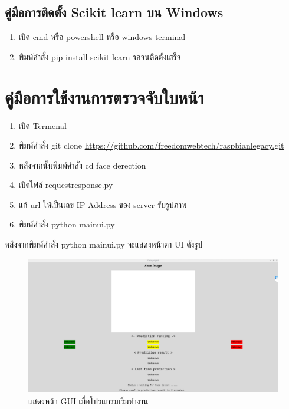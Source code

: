 \subsection{คู่มือการติดตั้ง Scikit learn บน Windows}
\begin{enumerate}
  \item เปิด cmd หรือ powershell หรือ windows terminal
  \item พิมพ์คำสั่ง pip install scikit-learn รอจนติดตั้งเสร็จ
\end{enumerate}


\section{คู่มือการใช้งานการตรวจจับใบหน้า}
\begin{enumerate}
  \item เปิด Termenal
  \item พิมพ์คำสั่ง git clone \url{https://github.com/freedomwebtech/raspbianlegacy.git}
  \item หลังจากนั้นพิมพ์คำสั่ง cd face derection
  \item เปิดไฟล์ request\textunderscore response.py 
  \item แก้ url ให้เป็นเลข IP Address ของ server รับรูปภาพ
  \item พิมพ์คำสั่ง python main\textunderscore ui.py
\end{enumerate}

หลังจากพิมพ์คำสั่ง python main\textunderscore ui.py จะแสดงหน้าตา UI ดังรูป

\begin{figure}[!ht]
  \begin{center}
    \includegraphics[scale=.3]{pic/main_page.png}
    \caption{แสดงหน้า GUI เมื่อโปรแกรมเริ่มทำงาน}
  \end{center}
\end{figure}

